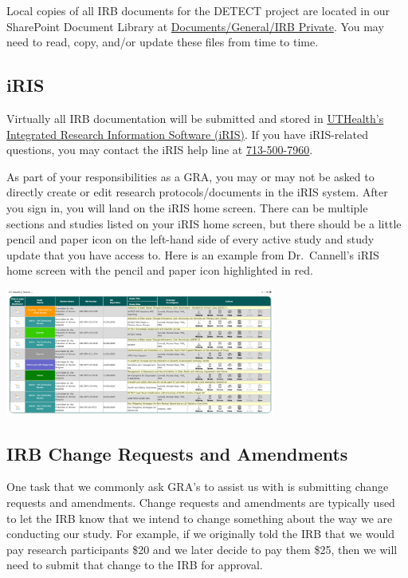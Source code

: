 \documentclass[
  letterpaper,
  DIV=11,
  numbers=noendperiod]{scrreprt}
\begin{document}
Local copies of all IRB documents for the DETECT project are located in
our SharePoint Document Library at
\href{https://uthtmc.sharepoint.com/sites/SPHDETECT-RPC/Shared\%20Documents/Forms/AllItems.aspx?FolderCTID=0x0120004E8A92AA55795C42852C8A438D043D68&id=\%2Fsites\%2FSPHDETECT\%2DRPC\%2FShared\%20Documents\%2FDETECT\%2DRPC\%20R61\%20R33\%202022\%2FIRB\%20Private}{Documents/General/IRB
Private}. You may need to read, copy, and/or update these files from
time to time.

\subsection{iRIS}\label{iris}

Virtually all IRB documentation will be submitted and stored in
\href{https://iris.uth.tmc.edu/}{UTHealth's Integrated Research
Information Software (iRIS)}. If you have iRIS-related questions, you
may contact the iRIS help line at \href{tel:7135007960}{713-500-7960}.

As part of your responsibilities as a GRA, you may or may not be asked
to directly create or edit research protocols/documents in the iRIS
system. After you sign in, you will land on the iRIS home screen. There
can be multiple sections and studies listed on your iRIS home screen,
but there should be a little pencil and paper icon on the left-hand side
of every active study and study update that you have access to. Here is
an example from Dr.~Cannell's iRIS home screen with the pencil and paper
icon highlighted in red.

\begin{center}
\includegraphics[width=3.49in,height=\textheight]{chapters/gra_tasks/../../graphics/iris.png}
\end{center}

\subsection{IRB Change Requests and
Amendments}\label{irb-change-requests-and-amendments}

One task that we commonly ask GRA's to assist us with is submitting
change requests and amendments. Change requests and amendments are
typically used to let the IRB know that we intend to change something
about the way we are conducting our study. For example, if we originally
told the IRB that we would pay research participants \$20 and we later
decide to pay them \$25, then we will need to submit that change to the
IRB for approval.
\end{document}
